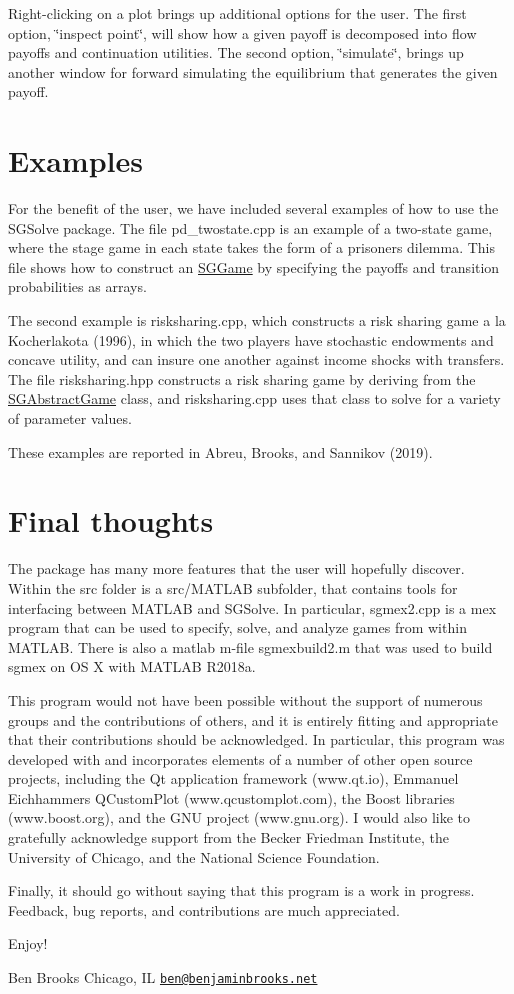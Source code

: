Right-\/clicking on a plot brings up additional options for the user. The first option, \char`\"{}inspect point\char`\"{}, will show how a given payoff is decomposed into flow payoffs and continuation utilities. The second option, \char`\"{}simulate\char`\"{}, brings up another window for forward simulating the equilibrium that generates the given payoff.\hypertarget{index_examplesec}{}\section{Examples}\label{index_examplesec}
For the benefit of the user, we have included several examples of how to use the S\+G\+Solve package. The file pd\+\_\+twostate.\+cpp is an example of a two-\/state game, where the stage game in each state takes the form of a prisoner\textquotesingle{}s dilemma. This file shows how to construct an \hyperlink{classSGGame}{S\+G\+Game} by specifying the payoffs and transition probabilities as arrays.

The second example is risksharing.\+cpp, which constructs a risk sharing game a la Kocherlakota (1996), in which the two players have stochastic endowments and concave utility, and can insure one another against income shocks with transfers. The file risksharing.\+hpp constructs a risk sharing game by deriving from the \hyperlink{classSGAbstractGame}{S\+G\+Abstract\+Game} class, and risksharing.\+cpp uses that class to solve for a variety of parameter values.

These examples are reported in Abreu, Brooks, and Sannikov (2019).\hypertarget{index_conclusionsec}{}\section{Final thoughts}\label{index_conclusionsec}
The package has many more features that the user will hopefully discover. Within the src folder is a src/\+M\+A\+T\+L\+AB subfolder, that contains tools for interfacing between M\+A\+T\+L\+AB and S\+G\+Solve. In particular, sgmex2.\+cpp is a mex program that can be used to specify, solve, and analyze games from within M\+A\+T\+L\+AB. There is also a matlab m-\/file sgmexbuild2.\+m that was used to build sgmex on OS X with M\+A\+T\+L\+AB R2018a.

This program would not have been possible without the support of numerous groups and the contributions of others, and it is entirely fitting and appropriate that their contributions should be acknowledged. In particular, this program was developed with and incorporates elements of a number of other open source projects, including the Qt application framework (www.\+qt.\+io), Emmanuel Eichhammer\textquotesingle{}s Q\+Custom\+Plot (www.\+qcustomplot.\+com), the Boost libraries (www.\+boost.\+org), and the G\+NU project (www.\+gnu.\+org). I would also like to gratefully acknowledge support from the Becker Friedman Institute, the University of Chicago, and the National Science Foundation.

Finally, it should go without saying that this program is a work in progress. Feedback, bug reports, and contributions are much appreciated.

Enjoy!

Ben Brooks Chicago, IL \href{mailto:ben@benjaminbrooks.net}{\tt ben@benjaminbrooks.\+net} 